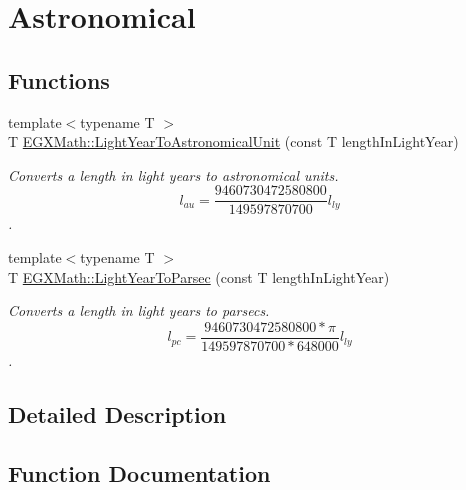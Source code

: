 \hypertarget{group___e_g_x_math-_conversions-_length_conversions-_astronomical-_light_year-_astronomical}{}\section{Astronomical}
\label{group___e_g_x_math-_conversions-_length_conversions-_astronomical-_light_year-_astronomical}
\subsection*{Functions}
\begin{DoxyCompactItemize}
\item 
{\footnotesize template$<$typename T $>$ }\\T \mbox{\hyperlink{group___e_g_x_math-_conversions-_length_conversions-_astronomical-_light_year-_astronomical_ga7e08f2da47a7b84833be76f30fe3840f}{E\+G\+X\+Math\+::\+Light\+Year\+To\+Astronomical\+Unit}} (const T length\+In\+Light\+Year)
\begin{DoxyCompactList}\small\item\em Converts a length in light years to astronomical units. \[ l_{au}= \frac{9460730472580800}{149597870700} l_{ly} \]. \end{DoxyCompactList}\item 
{\footnotesize template$<$typename T $>$ }\\T \mbox{\hyperlink{group___e_g_x_math-_conversions-_length_conversions-_astronomical-_light_year-_astronomical_ga7fbe95808f04d03719e53d868b0cac45}{E\+G\+X\+Math\+::\+Light\+Year\+To\+Parsec}} (const T length\+In\+Light\+Year)
\begin{DoxyCompactList}\small\item\em Converts a length in light years to parsecs. \[ l_{pc}=\frac{9460730472580800 * \pi}{149597870700 * 648000} l_{ly} \]. \end{DoxyCompactList}\end{DoxyCompactItemize}


\subsection{Detailed Description}


\subsection{Function Documentation}
\mbox{\label{group___e_g_x_math-_conversions-_length_conversions-_astronomical-_light_year-_astronomical_ga7e08f2da47a7b84833be76f30fe3840f}} 
